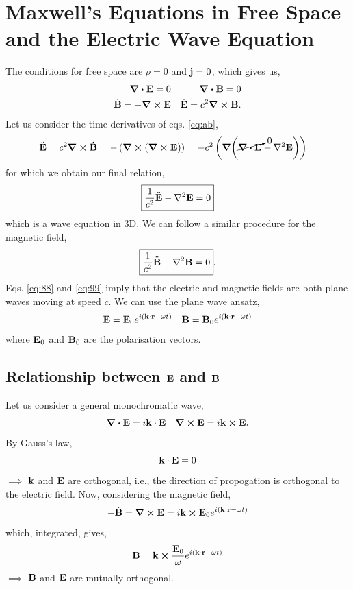 \documentclass{book}
\begin{document}
\section{Maxwell's Equations in Free Space and the Electric Wave Equation}
The conditions for free space are $\rho =0$ and $\vb{j} = 0$, which gives us,
\begin{align}
	\div{\vb{E}} = 0 && \div{\vb{B}} = 0 \\
	\Dot{\vb{B}} = -\curl{\vb{E}} && \Dot{\vb{E}} = c^2 \curl{\vb{B}} \label{eq:ab}.
\end{align}
Let us consider the time derivatives of eqs. \eqref{eq:ab},
\begin{equation}
	\begin{split}
		\Ddot{\vb{E}} = c^2 \curl{\Dot{\vb{B}}} & = -\left(\curl{(\curl{\vb{E}})}\right) 
		 = -c^2\left(\grad(\cancelto{0}{\div{\vb{E}}} - \laplacian{\vb{E}})\right)
	\end{split}
\end{equation}
for which we obtain our final relation,
\begin{equation}
	\boxed{\frac{1}{c^2}\Ddot{\vb{E}} - \laplacian \vb{E} = 0} \label{eq:88}
\end{equation}
which is a wave equation in 3D. We can follow a similar procedure for the magnetic field,
\begin{equation}
	\boxed{\frac{1}{c^2}\Ddot{\vb{B}} - \laplacian\vb{B} = 0}. \label{eq:99}
\end{equation}
Eqs. \eqref{eq:88} and \eqref{eq:99} imply that the electric and magnetic fields are both plane waves moving at speed $c$. We can use the plane wave ansatz,
\begin{align}
	\vb{E}= \vb{E}_0 e^{i(\vb{k}\cdot\vb{r} - \omega t)} && \vb{B} = \vb{B}_0e^{i(\vb{k}\cdot\vb{r} - \omega t)} \label{eq:plane wave ansatz}
\end{align}
where $\vb{E}_0$ and $\vb{B}_0$ are the polarisation vectors. 
\subsection{Relationship between $\vb{E}$ and $\vb{B}$}
Let us consider a general monochromatic wave,
\begin{align}
	\div{\vb{E}} = i\vb{k}\cdot\vb{E} && \curl{\vb{E}} = i\vb{k}\cross \vb{E}.
\end{align}
By Gauss's law,
\begin{equation}
	\vb{k}\cdot\vb{E} = 0
\end{equation}
$\implies$ $\vb{k}$ and $\vb{E}$ are orthogonal, i.e., the direction of propogation is orthogonal to the electric field. Now, considering the magnetic field,
\begin{equation}
	-\Dot{\vb{B}} = \curl{\vb{E}} = i\vb{k}\cross\vb{E}_0e^{i(\vb{k}\cdot\vb{r} - \omega t)}
\end{equation}
which, integrated, gives,
\begin{equation}
	\vb{B} = \vb{k}\cross \frac{\vb{E}_0}{\omega}e^{i(\vb{k}\cdot{\vb{r}} - \omega t)}
\end{equation}
$\implies$ $\vb{B}$ and $\vb{E}$ are mutually orthogonal.
\end{document}
